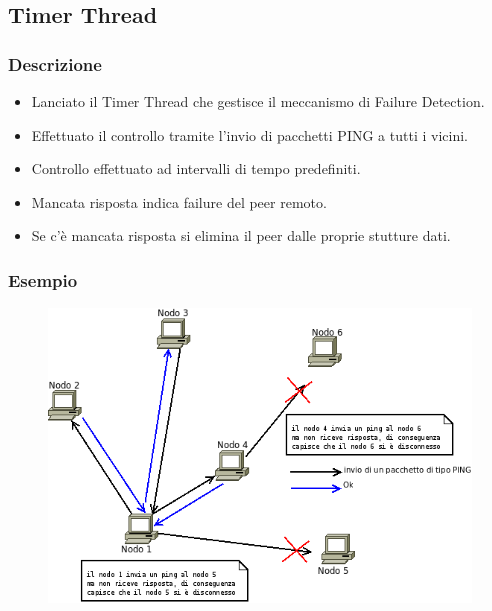 \documentclass[a4paper,italian,12pt]{beamer}
\begin{document}
		\subsection{Timer Thread}
			\begin{frame}
				\frametitle{Descrizione}
				\begin{itemize}
					\item Lanciato il Timer Thread che gestisce il meccanismo di Failure Detection.
					\item Effettuato il controllo tramite l'invio di pacchetti PING a tutti i vicini.
					\item Controllo effettuato ad intervalli di tempo predefiniti.
					\item Mancata risposta indica failure del peer remoto.
					\item Se c'è mancata risposta si elimina il peer dalle proprie stutture dati.
				\end{itemize}
			\end{frame}
			\begin{frame}
				\frametitle{Esempio}
				\begin{figure}[H]
					\includegraphics[scale=0.3]{etc/failure_detection.png}
				\end{figure}
			\end{frame}
\end{document}
